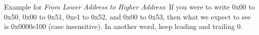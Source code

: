 \documentclass[addpoints, 12pt, answers]{exam}
\begin{document}
\begin{questions}
\begin{parts}
Example for \textit{From Lower Address to Higher Address}: If you were to write 0x00 to 0x50, 0x00 to 0x51, 0xe1 to 0x52, and 0x00 to 0x53, then what we expect to see is 0x0000e100 (case insensitive). In another word, keep leading and trailing 0.

\end{parts}



\end{questions}
\end{document}
